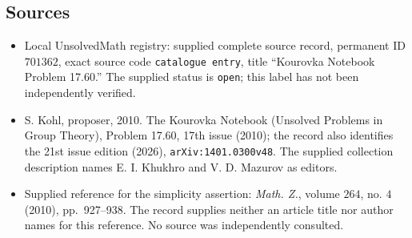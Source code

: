 \documentclass[11pt]{article}
\begin{document}
\subsection{Sources}
\begin{itemize}
\item Local UnsolvedMath registry: supplied complete source record, permanent ID \(701362\), exact source code \texttt{catalogue entry}, title ``Kourovka Notebook Problem 17.60.'' The supplied status is \texttt{open}; this label has not been independently verified.
\item S. Kohl, proposer, 2010. The Kourovka Notebook (Unsolved Problems in Group Theory), Problem 17.60, 17th issue (2010); the record also identifies the 21st issue edition (2026), \texttt{arXiv:1401.0300v48}. The supplied collection description names E. I. Khukhro and V. D. Mazurov as editors.
\item Supplied reference for the simplicity assertion: \emph{Math. Z.}, volume \(264\), no. \(4\) (2010), pp.\ 927--938. The record supplies neither an article title nor author names for this reference. No source was independently consulted.
\end{itemize}
\end{document}

